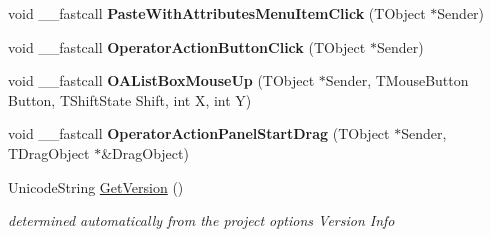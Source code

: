\begin{DoxyCompactItemize}
\item 
\mbox{\label{class_t_interface_a4732a8c5f1ccf8425bcc713969ed64a7}} 
void \+\_\+\+\_\+fastcall {\bfseries Paste\+With\+Attributes\+Menu\+Item\+Click} (T\+Object $\ast$Sender)
\item 
\mbox{\label{class_t_interface_a6ab8ece23e5d3fca1da26e2360e349ec}} 
void \+\_\+\+\_\+fastcall {\bfseries Operator\+Action\+Button\+Click} (T\+Object $\ast$Sender)
\item 
\mbox{\label{class_t_interface_a54c8faaf7d1d8f0456114676fd20a17f}} 
void \+\_\+\+\_\+fastcall {\bfseries O\+A\+List\+Box\+Mouse\+Up} (T\+Object $\ast$Sender, T\+Mouse\+Button Button, T\+Shift\+State Shift, int X, int Y)
\item 
\mbox{\label{class_t_interface_a659a63c1342a6d5ebd23422a608d140f}} 
void \+\_\+\+\_\+fastcall {\bfseries Operator\+Action\+Panel\+Start\+Drag} (T\+Object $\ast$Sender, T\+Drag\+Object $\ast$\&Drag\+Object)
\item 
\mbox{\label{class_t_interface_aa09ce755ae1d39671b9b358f86d83fde}} 
Unicode\+String \mbox{\hyperlink{class_t_interface_aa09ce755ae1d39671b9b358f86d83fde}{Get\+Version}} ()
\begin{DoxyCompactList}\small\item\em determined automatically from the project options \textquotesingle{}Version Info\textquotesingle{} \end{DoxyCompactList}\end{DoxyCompactItemize}
